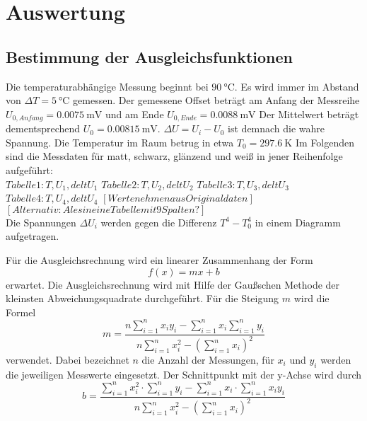 \section{Auswertung}
\label{sec:Auswertung}

\subsection{Bestimmung der Ausgleichsfunktionen}
Die temperaturabhängige Messung beginnt bei $\SI{90}{\celsius}$.
Es wird immer im Abstand von $\Delta T= \SI{5}{\celsius}$ gemessen.
Der gemessene Offset beträgt am Anfang der Messreihe $U_{0,Anfang} = \SI{0,0075}{\milli\volt}$ und am Ende $U_{0,Ende} = \SI{0,0088}{\milli\volt}$
Der Mittelwert beträgt dementsprechend $U_0 = \SI{0.00815}{\milli\volt}$.
$\Delta U = U_i - U_0$ ist demnach die wahre Spannung.
Die Temperatur im Raum betrug in etwa $T_0 = \SI{297,6}{\kelvin}$
Im Folgenden sind die Messdaten für matt, schwarz, glänzend und weiß in jener Reihenfolge aufgeführt:
\\
$Tabelle 1: T, U_1, delt U_1$
$Tabelle 2: T, U_2, delt U_2$
$Tabelle 3: T, U_3, delt U_3$
$Tabelle 4: T, U_4, delt U_4$
$[Werte nehmen aus Originaldaten]$
$[Alternativ: Ales in eine Tabelle mit 9 Spalten?]$
\\
Die Spannungen $\Delta U_i$ werden gegen die Differenz $T^4 - T_0^4$ in einem Diagramm aufgetragen.


Für die Ausgleichsrechnung wird ein linearer Zusammenhang der Form
\begin{equation}
  f(x) = mx + b
\end{equation}
erwartet.
Die Ausgleichsrechnung wird mit Hilfe der Gaußschen Methode der kleinsten Abweichungsquadrate durchgeführt.
Für die Steigung $m$ wird die Formel
\begin{equation}
  m = \frac{ n \sum_{i=1}^n x_i y_i - \sum_{i=1}^n x_i \sum_{i=1}^n y_i }{n\sum_{i=1}^n x_i^2 - ( \sum_{i=1}^n x_i )^2}
\end{equation}
verwendet. Dabei bezeichnet $n$ die Anzahl der Messungen, für $x_i$ und $y_i$ werden die jeweiligen Messwerte eingesetzt. Der Schnittpunkt mit der y-Achse wird durch
\begin{equation}
  b = \frac{ \sum_{i=1}^n x_i^2 \cdot \sum_{i=1}^n y_i - \sum_{i=1}^n x_i \cdot \sum_{i=1}^n x_i y_i}{n\sum_{i=1}^n x_i^2 - ( \sum_{i=1}^n x_i )^2}
\end{equation}

